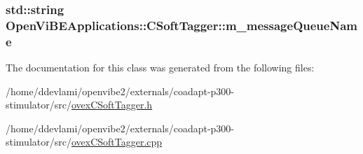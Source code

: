 \label{classOpenViBEApplications_1_1CSoftTagger_aff273e78a785a463d60890e7d86ec862}
\hypertarget{classOpenViBEApplications_1_1CSoftTagger_a65fb264b86640b26e4e1a78092e69f28}{
\subsubsection[{m\_\-messageQueueName}]{\setlength{\rightskip}{0pt plus 5cm}std::string {\bf OpenViBEApplications::CSoftTagger::m\_\-messageQueueName}}}
\label{classOpenViBEApplications_1_1CSoftTagger_a65fb264b86640b26e4e1a78092e69f28}


The documentation for this class was generated from the following files:\begin{DoxyCompactItemize}
\item 
/home/ddevlami/openvibe2/externals/coadapt-\/p300-\/stimulator/src/\hyperlink{ovexCSoftTagger_8h}{ovexCSoftTagger.h}\item 
/home/ddevlami/openvibe2/externals/coadapt-\/p300-\/stimulator/src/\hyperlink{ovexCSoftTagger_8cpp}{ovexCSoftTagger.cpp}\end{DoxyCompactItemize}
